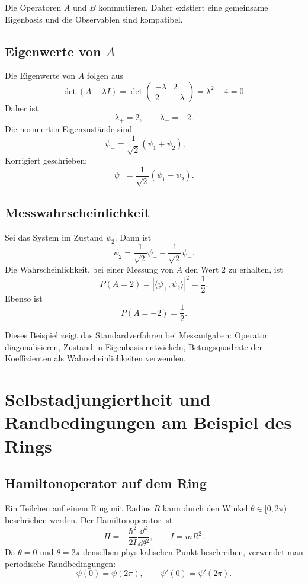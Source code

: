 \begin{answerbox}
Die Operatoren $A$ und $B$ kommutieren. Daher existiert eine gemeinsame Eigenbasis und die Observablen sind kompatibel.
\end{answerbox}

\subsection{Eigenwerte von $A$}

Die Eigenwerte von $A$ folgen aus
\[
    \det(A-\lambda I)
    =\det\begin{pmatrix}-\lambda&2\\2&-\lambda\end{pmatrix}
    =\lambda^2-4=0.
\]
Daher ist
\[
    \lambda_+=2,
    \qquad
    \lambda_-=-2.
\]
Die normierten Eigenzustände sind
\[
    \psi_+=\frac{1}{\sqrt2}(\psi_1+\psi_2),
    \qquad
    \]
Korrigiert geschrieben:
\[
    \psi_- =\frac{1}{\sqrt2}(\psi_1-\psi_2).
\]

\subsection{Messwahrscheinlichkeit}

Sei das System im Zustand $\psi_2$. Dann ist
\[
    \psi_2=\frac{1}{\sqrt2}\psi_+-\frac{1}{\sqrt2}\psi_-.
\]
Die Wahrscheinlichkeit, bei einer Messung von $A$ den Wert $2$ zu erhalten, ist
\[
    P(A=2)=|\langle\psi_+,\psi_2\rangle|^2=\frac12.
\]
Ebenso ist
\[
    P(A=-2)=\frac12.
\]

\begin{conceptbox}
Dieses Beispiel zeigt das Standardverfahren bei Messaufgaben: Operator diagonalisieren, Zustand in Eigenbasis entwickeln, Betragsquadrate der Koeffizienten als Wahrscheinlichkeiten verwenden.
\end{conceptbox}

\section{Selbstadjungiertheit und Randbedingungen am Beispiel des Rings}

\subsection{Hamiltonoperator auf dem Ring}

Ein Teilchen auf einem Ring mit Radius $R$ kann durch den Winkel $\theta\in[0,2\pi)$ beschrieben werden. Der Hamiltonoperator ist
\[
    H=-\frac{\hbar^2}{2I}\frac{\dd^2}{\dd\theta^2},
    \qquad
    I=mR^2.
\]
Da $\theta=0$ und $\theta=2\pi$ denselben physikalischen Punkt beschreiben, verwendet man periodische Randbedingungen:
\[
    \psi(0)=\psi(2\pi),
    \qquad
    \psi'(0)=\psi'(2\pi).
\]

